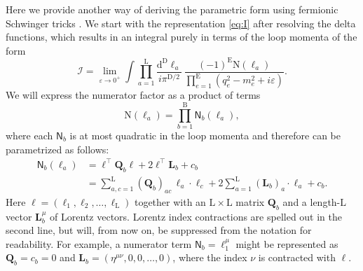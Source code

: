 \documentclass[12pt]{article}
\numberwithin{figure}{section}
\def \be {\begin{equation}}
\def \ee {\end{equation}}
\def \nn {\nonumber}
\def \D {\mathrm{D}}
\def \E {\mathrm{E}}
\def \L {\mathrm{L}}
\def \d {\mathrm{d}}
\def \eps {\varepsilon}
\def \I {\mathcal{I}}
\def \NN {\mathrm{N}}
\def \LL {\mathbf{L}}
\newcommand*\Bell{\ensuremath{\boldsymbol\ell}}
\begin{document}
Here we provide another way of deriving the parametric form using fermionic Schwinger tricks \cite{AHHM}. We start with the representation \eqref{eq:I} after resolving the delta functions, which results in an integral purely in terms of the loop momenta of the form
%
\be
\I = \lim_{\eps \to 0^+} \int \prod_{a=1}^{\L}\frac{\d^\D \ell_a}{i\pi^{\D/2}}\, \frac{ (-1)^\E \NN(\ell_a)}{\prod_{e=1}^{\E} (q_e^2 - m_e^2 + i\eps)}.
\ee
%
We will express the numerator factor as a product of terms
%
\be
\NN(\ell_a) =  \prod_{b=1}^{\mathrm{B}} \mathsf{N}_{b}(\ell_a),
\ee
%
where each $\mathsf{N}_{b}$ is at most quadratic in the loop momenta and therefore can be parametrized as follows:
%
\begin{align}
\mathsf{N}_b(\ell_a) &= \Bell^{\intercal} \mathbf{Q}_b \Bell + 2\Bell^\intercal \mathbf{L}_b + c_b\\
&= \sum_{a,c=1}^{\L} (\mathbf{Q}_b)_{ac}\, \ell_a {\cdot} \ell_c + 2\sum_{a=1}^{\L} (\mathbf{L}_b)_a {\cdot} \ell_a + c_b\nn.
\end{align}
%
Here $\Bell = (\ell_1, \ell_2, \ldots, \ell_{\L})$ together with an $\L \times \L$ matrix $\mathbf{Q}_b$ and a length-$\L$ vector $\LL_b^\mu$ of Lorentz vectors. Lorentz index contractions are spelled out in the second line, but will, from now on, be suppressed from the notation for readability. For example, a numerator term $\mathsf{N}_b = \ell_1^\mu$ might be represented as $\mathbf{Q}_b = c_b = 0$ and $\mathbf{L}_b = (\eta^{\mu\nu}, 0, 0, \ldots, 0)$, where the index $\nu$ is contracted with $\Bell$.
\end{document}
